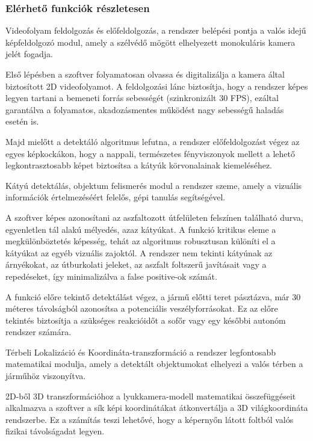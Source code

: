 \subsubsection{Elérhető funkciók
részletesen}\label{eluxe9rhetux151-funkciuxf3k-ruxe9szletesen}

Videofolyam feldolgozás és
előfeldolgozás, a rendszer belépési pontja a valós idejű képfeldolgozó modul, amely a
szélvédő mögött elhelyezett monokuláris kamera jelét fogadja.

Első lépésben a szoftver folyamatosan olvassa és digitalizálja a kamera
által biztosított 2D videofolyamot. A feldolgozási lánc biztosítja, hogy
a rendszer képes legyen tartani a bemeneti forrás sebességét
(szinkronizált 30 FPS), ezáltal garantálva a folyamatos, akadozásmentes
működést nagy sebességű haladás esetén is.

Majd mielőtt a detektáló algoritmus lefutna, a rendszer előfeldolgozást
végez az egyes képkockákon, hogy a nappali, természetes fényviszonyok
mellett a lehető legkontrasztosabb képet biztosítsa a kátyúk
körvonalainak kiemeléséhez.

Kátyú detektálás, objektum
felismerés modul a rendszer szeme, amely a vizuális információk értelmezéséért
felelős, gépi tanulás segítségével.

A szoftver képes azonosítani az aszfaltozott útfelületen felszínen
található durva, egyenletlen tál alakú mélyedés, azaz kátyúkat. A
funkció kritikus eleme a megkülönböztetés képesség, tehát az algoritmus
robusztusan különíti el a kátyúkat az egyéb vizuális zajoktól. A
rendszer nem tekinti kátyúnak az árnyékokat, az útburkolati jeleket, az
aszfalt foltszerű javításait vagy a repedéseket, így minimalizálva a
false positive-ok számát.

A funkció előre tekintő detektálást végez, a jármű előtti teret
pásztázva, már 30 méteres távolságból azonosítsa a potenciális
veszélyforrásokat. Ez az előre tekintés biztosítja a szükséges
reakcióidőt a sofőr vagy egy későbbi autonóm rendszer számára.

 Térbeli Lokalizáció és
Koordináta-transzformáció a rendszer legfontosabb matematikai modulja, amely a detektált
objektumokat elhelyezi a valós térben a járműhöz viszonyítva.

2D-ből 3D transzformációhoz a lyukkamera-modell
matematikai összefüggéseit alkalmazva a szoftver a sík képi
koordinátákat átkonvertálja a 3D világkoordináta rendszerbe. Ez a
számítás teszi lehetővé, hogy a képernyőn látott foltból valós fizikai
távolságadat legyen.

